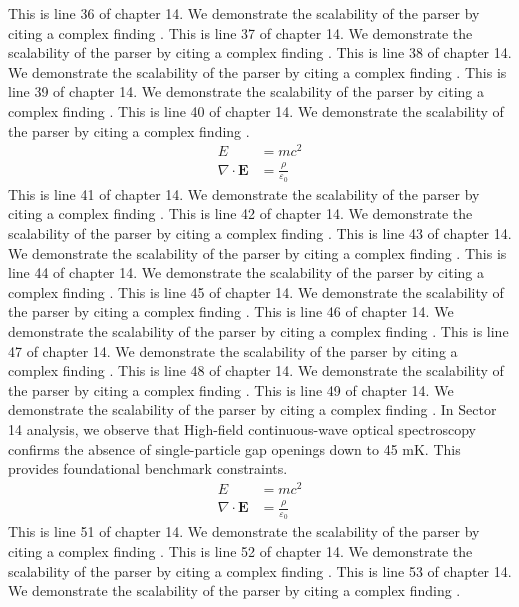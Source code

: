 This is line 36 of chapter 14. We demonstrate the scalability of the parser by citing a complex finding \cite{ref14_36}.
This is line 37 of chapter 14. We demonstrate the scalability of the parser by citing a complex finding \cite{ref14_37}.
This is line 38 of chapter 14. We demonstrate the scalability of the parser by citing a complex finding \cite{ref14_38}.
This is line 39 of chapter 14. We demonstrate the scalability of the parser by citing a complex finding \cite{ref14_39}.
This is line 40 of chapter 14. We demonstrate the scalability of the parser by citing a complex finding \cite{ref14_40}.
\begin{align*}
  E &= mc^2 \\
  \nabla \cdot \mathbf{E} &= \frac{\rho}{\varepsilon_0}
\end{align*}
This is line 41 of chapter 14. We demonstrate the scalability of the parser by citing a complex finding \cite{ref14_41}.
This is line 42 of chapter 14. We demonstrate the scalability of the parser by citing a complex finding \cite{ref14_42}.
This is line 43 of chapter 14. We demonstrate the scalability of the parser by citing a complex finding \cite{ref14_43}.
This is line 44 of chapter 14. We demonstrate the scalability of the parser by citing a complex finding \cite{ref14_44}.
This is line 45 of chapter 14. We demonstrate the scalability of the parser by citing a complex finding \cite{ref14_45}.
This is line 46 of chapter 14. We demonstrate the scalability of the parser by citing a complex finding \cite{ref14_46}.
This is line 47 of chapter 14. We demonstrate the scalability of the parser by citing a complex finding \cite{ref14_47}.
This is line 48 of chapter 14. We demonstrate the scalability of the parser by citing a complex finding \cite{ref14_48}.
This is line 49 of chapter 14. We demonstrate the scalability of the parser by citing a complex finding \cite{ref14_49}.
In Sector 14 analysis, we observe that High-field continuous-wave optical spectroscopy confirms the absence of single-particle gap openings down to 45 mK. This provides foundational benchmark constraints.
\begin{align*}
  E &= mc^2 \\
  \nabla \cdot \mathbf{E} &= \frac{\rho}{\varepsilon_0}
\end{align*}
This is line 51 of chapter 14. We demonstrate the scalability of the parser by citing a complex finding \cite{ref14_51}.
This is line 52 of chapter 14. We demonstrate the scalability of the parser by citing a complex finding \cite{ref14_52}.
This is line 53 of chapter 14. We demonstrate the scalability of the parser by citing a complex finding \cite{ref14_53}.
